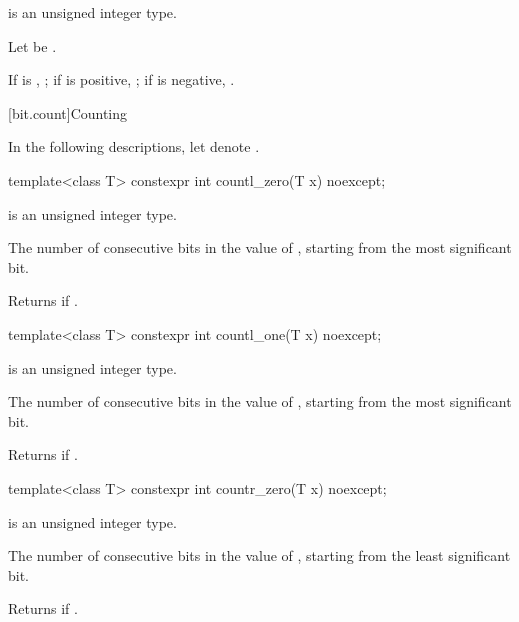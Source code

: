 %
\begin{itemdescr}
\pnum
\constraints
{} is an unsigned integer type.

\pnum
Let  be .

\pnum
\returns
If  is , ;
if  is positive, ;
if  is negative, .
\end{itemdescr}

[bit.count]{Counting}

\pnum
In the following descriptions,
let  denote .

\begin{itemdecl}
template<class T>
  constexpr int countl_zero(T x) noexcept;
\end{itemdecl}

%
\begin{itemdescr}
\pnum
\constraints
{} is an unsigned integer type.

\pnum
\returns
The number of consecutive  bits in the value of ,
starting from the most significant bit.
\begin{note}
Returns  if .
\end{note}
\end{itemdescr}

\begin{itemdecl}
template<class T>
  constexpr int countl_one(T x) noexcept;
\end{itemdecl}

%
\begin{itemdescr}
\pnum
\constraints
{} is an unsigned integer type.

\pnum
\returns
The number of consecutive  bits in the value of ,
starting from the most significant bit.
\begin{note}
Returns  if .
\end{note}
\end{itemdescr}

\begin{itemdecl}
template<class T>
  constexpr int countr_zero(T x) noexcept;
\end{itemdecl}

%
\begin{itemdescr}
\pnum
\constraints
{} is an unsigned integer type.

\pnum
\returns
The number of consecutive  bits in the value of ,
starting from the least significant bit.
\begin{note}
Returns  if .
\end{note}
\end{itemdescr}

